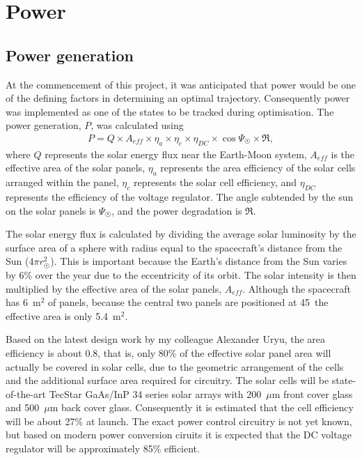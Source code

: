 
\section{Power}\label{sec:Vehicle-power}

\subsection{Power generation} \label{sub:Power-generation}

At the commencement of this project, it was anticipated that power would be one of the defining factors in determining an optimal trajectory. Consequently power was implemented as one of the states to be tracked during optimisation. The power generation, $P$, was calculated using 
\begin{gather} \label{eq:Power-generation}
P = Q\times A_{eff}\times\eta_a\times\eta_c\times\eta_{DC}\times\cos\Psi_\Sun\times\mathfrak{R},
\end{gather}
where $Q$ represents the solar energy flux near the Earth-Moon system, $A_{eff}$ is the effective area of the solar panels, $\eta_a$ represents the area efficiency of the solar cells arranged within the panel, $\eta_c$ represents the solar cell efficiency, and $\eta_{DC}$ represents the efficiency of the voltage regulator. The angle subtended by the sun on the solar panels is $\Psi_\Sun$, and the power degradation is $\mathfrak{R}$.

The solar energy flux is calculated by dividing the average solar luminosity \parencite[$3.846\times10^{26}$ W,][]{Montenbruck2000} by the surface area of a sphere with radius equal to the spacecraft's distance from the Sun ($4\pi r_\Sun^2$). This is important because the Earth's distance from the Sun varies by 6\% over the year \parencite{Montenbruck2000} due to the eccentricity of its orbit. The solar intensity is then multiplied by the effective area of the solar panels, $A_{eff}$. Although the spacecraft has 6~m$^2$ of panels, because the central two panels are positioned at 45\degrees\ the effective area is only 5.4~m$^2$.

Based on the latest design work by my colleague Alexander Uryu, the area efficiency is about 0.8, that is, only 80\% of the effective solar panel area will actually be covered in solar cells, due to the geometric arrangement of the cells and the additional surface area required for circuitry. The solar cells will be state-of-the-art TecStar GaAs/InP 34 series solar arrays with 200~$\mu$m front cover glass and 500~$\mu$m back cover glass. Consequently it is estimated that the cell efficiency will be about 27\% at launch. The exact power control circuitry is not yet known, but based on modern power conversion ciruits it is expected that the DC voltage regulator will be approximately 85\% efficient. 

